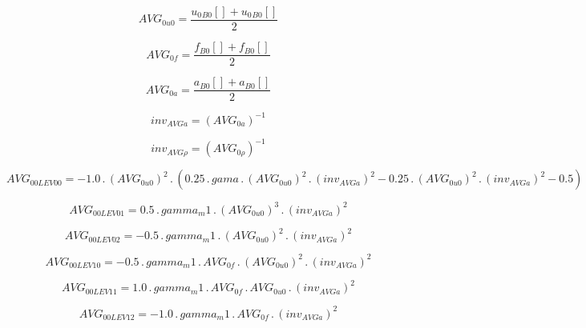 \documentclass{article}
\begin{document}
\begin{dmath}AVG_{0 u0} = \frac{{u_{0}{_{B0}}}[{}] + {u_{0}{_{B0}}}[{}]}{2}\end{dmath}

\begin{dmath}AVG_{0 f} = \frac{{f{_{B0}}}[{}] + {f{_{B0}}}[{}]}{2}\end{dmath}

\begin{dmath}AVG_{0 a} = \frac{{a{_{B0}}}[{}] + {a{_{B0}}}[{}]}{2}\end{dmath}

\begin{dmath}inv_{AVG a} = \left(AVG_{0 a} \right)^{-1}\end{dmath}

\begin{dmath}inv_{AVG \rho} = \left(AVG_{0 \rho} \right)^{-1}\end{dmath}

\begin{dmath}AVG_{0 0 LEV 00} = - 1.0 \,.\, \left(AVG_{0 u0} \right)^{2} \,.\, \left(0.25 \,.\, gama \,.\, \left(AVG_{0 u0} \right)^{2} \,.\, \left(inv_{AVG a} \right)^{2} - 0.25 \,.\, \left(AVG_{0 u0} \right)^{2} \,.\, \left(inv_{AVG a} \right)^{2} 
- 0.5\right)\end{dmath}

\begin{dmath}AVG_{0 0 LEV 01} = 0.5 \,.\, gamma_m1 \,.\, \left(AVG_{0 u0} \right)^{3} \,.\, \left(inv_{AVG a} \right)^{2}\end{dmath}

\begin{dmath}AVG_{0 0 LEV 02} = - 0.5 \,.\, gamma_m1 \,.\, \left(AVG_{0 u0} \right)^{2} \,.\, \left(inv_{AVG a} \right)^{2}\end{dmath}

\begin{dmath}AVG_{0 0 LEV 10} = - 0.5 \,.\, gamma_m1 \,.\, AVG_{0 f} \,.\, \left(AVG_{0 u0} \right)^{2} \,.\, \left(inv_{AVG a} \right)^{2}\end{dmath}

\begin{dmath}AVG_{0 0 LEV 11} = 1.0 \,.\, gamma_m1 \,.\, AVG_{0 f} \,.\, AVG_{0 u0} \,.\, \left(inv_{AVG a} \right)^{2}\end{dmath}

\begin{dmath}AVG_{0 0 LEV 12} = - 1.0 \,.\, gamma_m1 \,.\, AVG_{0 f} \,.\, \left(inv_{AVG a} \right)^{2}\end{dmath}
\end{document}
